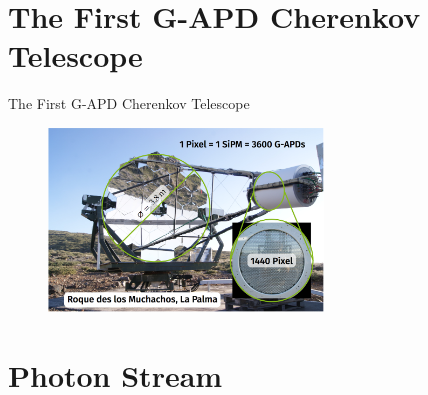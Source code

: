 



\maketitle

\section{The First G-APD Cherenkov Telescope}

\begin{frame}[t]{The First G-APD Cherenkov Telescope}
    \begin{figure}
        \centering\includegraphics[width=0.65\textwidth]{fig/fact.png}
    \end{figure}
\end{frame}

\section{Photon Stream}

